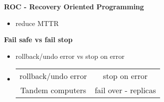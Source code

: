 \documentclass[twoside]{article}
\begin{document}
\textbf{ROC - Recovery Oriented Programming}
\begin{itemize}
    \item reduce MTTR
\end{itemize}

\textbf{Fail safe vs fail stop}
\begin{itemize}
    \item rollback/undo error vs stop on error
\item \begin{tabular}{c|c}
     rollback/undo error & stop on error\\
     Tandem computers & fail over - replicas\\
\end{tabular}
\end{itemize}
\end{document}
